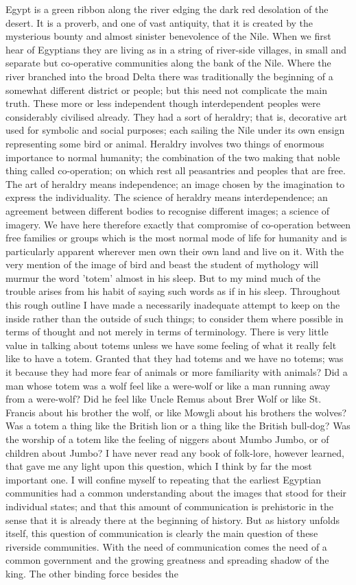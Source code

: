 Egypt is a green ribbon along the river edging the dark red desolation of the desert. It is a proverb, and one of vast antiquity, that it is created by the mysterious bounty and almost sinister benevolence of the Nile. When we first hear of Egyptians they are living as in a string of river-side villages, in small and separate but co-operative communities along the bank of the Nile. Where the river branched into the broad Delta there was traditionally the beginning of a somewhat different district or people; but this need not complicate the main truth. These more or less independent though interdependent peoples were considerably civilised already. They had a sort of heraldry; that is, decorative art used for symbolic and social purposes; each sailing the Nile under its own ensign representing some bird or animal. Heraldry involves two things of enormous importance to normal humanity; the combination of the two making that noble thing called co-operation; on which rest all peasantries and peoples that are free. The art of heraldry means independence; an image chosen by the imagination to express the individuality. The science of heraldry means interdependence; an agreement between different bodies to recognise different images; a science of imagery. We have here therefore exactly that compromise of co-operation between free families or groups which is the most normal mode of life for humanity and is particularly apparent wherever men own their own land and live on it. With the very mention of the image of bird and beast the student of mythology will murmur the word 'totem' almost in his sleep. But to my mind much of the trouble arises from his habit of saying such words as if in his sleep. Throughout this rough outline I have made a necessarily inadequate attempt to keep on the inside rather than the outside of such things; to consider them where possible in terms of thought and not merely in terms of terminology. There is very little value in talking about totems unless we have some feeling of what it really felt like to have a totem. Granted that they had totems and we have no totems; was it because they had more fear of animals or more familiarity with animals? Did a man whose totem was a wolf feel like a were-wolf or like a man running away from a were-wolf? Did he feel like Uncle Remus about Brer Wolf or like St. Francis about his brother the wolf, or like Mowgli about his brothers the wolves? Was a totem a thing like the British lion or a thing like the British bull-dog? Was the worship of a totem like the feeling of niggers about Mumbo Jumbo, or of children about Jumbo? I have never read any book of folk-lore, however learned, that gave me any light upon this question, which I think by far the most important one. I will confine myself to repeating that the earliest Egyptian communities had a common understanding about the images that stood for their individual states; and that this amount of communication is prehistoric in the sense that it is already there at the beginning of history. But as history unfolds itself, this question of communication is clearly the main question of these riverside communities. With the need of communication comes the need of a common government and the growing greatness and spreading shadow of the king. The other binding force besides the 